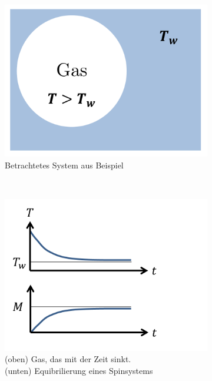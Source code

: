 \documentclass[12pt]{article}
\begin{document}
\begin{figure}[h] 
		\begin{subfigure}[h]{0.5 \textwidth}
		\centering
		\includegraphics[width=\textwidth]{Folie29.png}
		\caption{Betrachtetes System aus Beispiel} 
		\label{fig:Gassystem}
		\centering
	\end{subfigure}
	~
\begin{subfigure}[h]{0.5\textwidth}
		\centering
		\includegraphics[width=\textwidth]{Folie30.png}
		\caption{(oben) Gas, das mit der Zeit sinkt. \\ (unten) Equibrilierung eines Spinsystems}
		\label{fig:sinken}
		\centering
	\end{subfigure}
	\caption{ }
\end{figure}	
\end{document}
